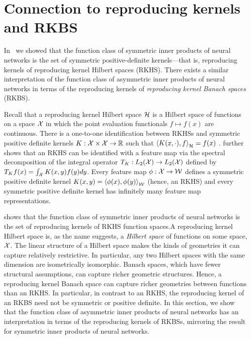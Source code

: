 \section{Connection to reproducing kernels and RKBS}\label{sec:rkbs_asymmetric_relations}

In~ we showed that the function class of symmetric inner products of neural networks is the set of symmetric positive-definite kernels---that is, reproducing kernels of reproducing kernel Hilbert spaces (RKHS). There exists a similar interpretation of the function class of asymmetric inner products of neural networks in terms of the reproducing kernels of \textit{reproducing kernel Banach spaces} (RKBS).

Recall that a reproducing kernel Hilbert space ${\mathcal{H}}$ is a Hilbert space of functions on a space ${\mathcal{X}}$ in which the point evaluation functionals $f \mapsto f(x)$ are continuous. There is a one-to-one identification between RKHSs and symmetric positive definite kernels $K: {\mathcal{X}} \times {\mathcal{X}} \to \mathbb{R}$ such that $\left \langle K(x, \cdot), f \right\rangle_{\mathcal{H}} = f(x)$ \parencite{aronszajn1950theory}. \parencite{mercerFunctionsPositive1909} further shows that an RKHS can be identified with a feature map via the spectral decomposition of the integral operator $T_K: L_2({\mathcal{X}}) \to L_2({\mathcal{X}})$ defined by $T_K f(x) = \int_{\mathcal{X}} K(x, y) f(y) dy$. Every feature map $\phi: {\mathcal{X}} \to {\mathcal{W}}$ defines a symmetric positive definite kernel $K(x, y) = \left \langle \phi(x), \phi(y) \right\rangle_{\mathcal{W}}$ (hence, an RKHS) and every symmetric positive definite kernel has infinitely many feature map representations.

 shows that the function class of symmetric inner products of neural networks is the set of reproducing kernels of RKHS function spaces.A reproducing kernel Hilbert space is, as the name suggests, a \textit{Hilbert space} of functions on some space, ${\mathcal{X}}$. The linear structure of a Hilbert space makes the kinds of geometries it can capture relatively restrictive. In particular, any two Hilbert spaces with the same dimension are isometrically isomorphic. Banach spaces, which have fewer structural assumptions, can capture richer geometric structures. Hence, a reproducing kernel Banach space can capture richer geometries between functions than an RKHS. In particular, in contrast to an RKHS, the reproducing kernel of an RKBS need not be symmetric or positive definite. In this section, we show that the function class of asymmetric inner products of neural networks has an interpretation in terms of the reproducing kernels of RKBSs, mirroring the result for symmetric inner products of neural networks.

